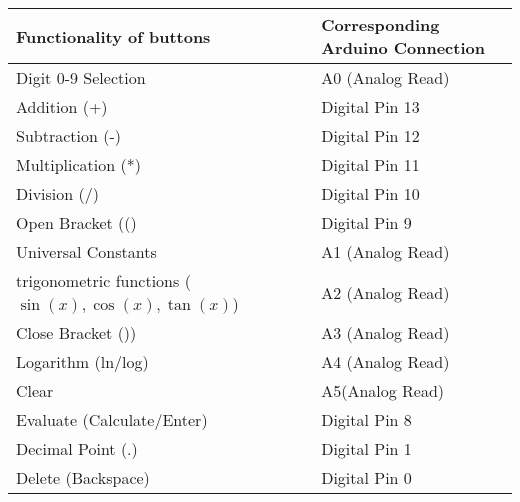 \begin{table}[h!]
    \centering
    \renewcommand{\arraystretch}{1.3}
    \begin{tabular}{|l|l|}
        \hline
        \textbf{Functionality of buttons} & \textbf{Corresponding Arduino Connection} \\
        \hline
        Digit 0-9 Selection & A0 (Analog Read) \\
        Addition (+) & Digital Pin 13 \\
        Subtraction (-) & Digital Pin 12 \\
        Multiplication (*) & Digital Pin 11 \\
        Division (/) & Digital Pin 10 \\
        Open Bracket (() & Digital Pin 9 \\
	    Universal Constants & A1 (Analog Read)\\
	    trigonometric functions ($\sin(x),\cos(x),\tan(x)$)& A2 (Analog Read)\\
        Close Bracket ()) & A3 (Analog Read) \\
        Logarithm (ln/log) & A4 (Analog Read) \\
        Clear & A5(Analog Read) \\
        Evaluate (Calculate/Enter) & Digital Pin 8 \\
        Decimal Point (.) & Digital Pin 1 \\
        Delete (Backspace) & Digital Pin 0 \\
        \hline
    \end{tabular}
    \label{tab:button_connections}
\end{table}
